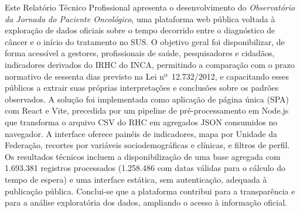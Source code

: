 \documentclass{bsimc}
\begin{document}
	\begin{resumo}{}

		Este Relatório Técnico Profissional apresenta o desenvolvimento do \textit{Observatório da Jornada do Paciente Oncológico}, uma plataforma web pública voltada à exploração de dados oficiais sobre o tempo decorrido entre o diagnóstico de câncer e o início do tratamento no \acs{SUS}. O objetivo geral foi disponibilizar, de forma acessível a gestores, profissionais de saúde, pesquisadores e cidadãos, indicadores derivados do \acs{IRHC} do \acs{INCA}, permitindo a comparação com o prazo normativo de sessenta dias previsto na Lei nº~12.732/2012, e capacitando esses públicos a extrair suas próprias interpretações e conclusões sobre os padrões observados. A solução foi implementada como aplicação de página única (\acs{SPA}) com React e Vite, precedida por um pipeline de pré-processamento em Node.js que transforma o arquivo \acs{CSV} do \acs{RHC} em agregados \acs{JSON} consumidos no navegador. A interface oferece painéis de indicadores, mapa por Unidade da Federação, recortes por variáveis sociodemográficas e clínicas, e filtros de perfil. Os resultados técnicos incluem a disponibilização de uma base agregada com 1.693.381 registros processados (1.258.486 com datas válidas para o cálculo do tempo de espera) e uma interface estática, sem autenticação, adequada à publicação pública. Conclui-se que a plataforma contribui para a transparência e para a análise exploratória dos dados, ampliando o acesso à informação oficial.

	\end{resumo}
\end{document}
